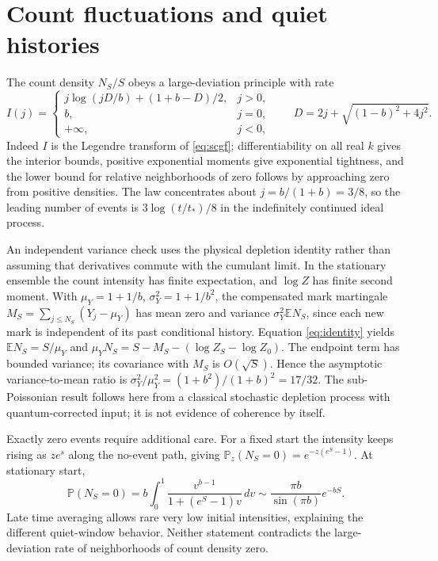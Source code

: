 \documentclass[10pt]{article}
\newcommand{\E}{\mathbb E}
\newcommand{\Pp}{\mathbb P}
\begin{document}
\section{Count fluctuations and quiet histories}
The count density $N_S/S$ obeys a large-deviation principle with rate
\begin{equation}
I(j)=
\begin{cases}
 j\log(jD/b)+(1+b-D)/2,&j>0,\\
 b,&j=0,\\
 +\infty,&j<0,
\end{cases}
\qquad
D=2j+\sqrt{(1-b)^2+4j^2}.
\end{equation}
Indeed $I$ is the Legendre transform of \eqref{eq:scgf}; differentiability on all real $k$ gives the interior bounds, positive exponential moments give exponential tightness, and the lower bound for relative neighborhoods of zero follows by approaching zero from positive densities. The law concentrates about $j=b/(1+b)=3/8$, so the leading number of events is $3\log(t/t_*)/8$ in the indefinitely continued ideal process.

An independent variance check uses the physical depletion identity rather than assuming that derivatives commute with the cumulant limit. In the stationary ensemble the count intensity has finite expectation, and $\log Z$ has finite second moment. With $\mu_Y=1+1/b$, $\sigma_Y^2=1+1/b^2$, the compensated mark martingale $M_S=\sum_{j\le N_S}(Y_j-\mu_Y)$ has mean zero and variance $\sigma_Y^2\E N_S$, since each new mark is independent of its past conditional history. Equation \eqref{eq:identity} yields $\E N_S=S/\mu_Y$ and $\mu_Y N_S=S-M_S-(\log Z_S-\log Z_0)$. The endpoint term has bounded variance; its covariance with $M_S$ is $O(\sqrt S)$. Hence the asymptotic variance-to-mean ratio is $\sigma_Y^2/\mu_Y^2=(1+b^2)/(1+b)^2=17/32$. The sub-Poissonian result follows here from a classical stochastic depletion process with quantum-corrected input; it is not evidence of coherence by itself.

Exactly zero events require additional care. For a fixed start the intensity keeps rising as $ze^s$ along the no-event path, giving $\Pp_z(N_S=0)=e^{-z(e^S-1)}$. At stationary start,
\[
\Pp(N_S=0)=b\int_0^1\frac{v^{b-1}}{1+(e^S-1)v}\,dv
\sim\frac{\pi b}{\sin(\pi b)}e^{-bS}.
\]
Late time averaging allows rare very low initial intensities, explaining the different quiet-window behavior. Neither statement contradicts the large-deviation rate of neighborhoods of count density zero.
\end{document}

